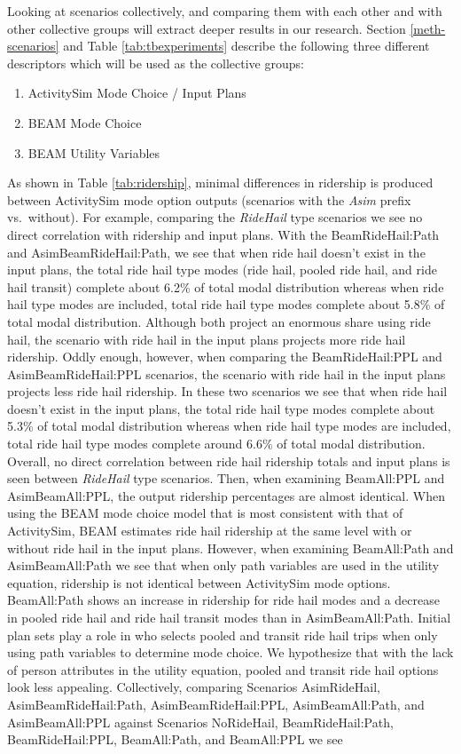 \documentclass[fancy, masters]{byuthesis}
\providecommand{\tightlist}{%
  \setlength{\itemsep}{0pt}\setlength{\parskip}{0pt}}
\begin{document}
Looking at scenarios collectively, and comparing them with each other and with other collective groups will extract deeper results in our research. Section \ref{meth-scenarios} and Table \ref{tab:tbexperiments} describe the following three different descriptors which will be used as the collective groups:

\begin{enumerate}
\def\labelenumi{\arabic{enumi}.}
\tightlist
\item
  ActivitySim Mode Choice / Input Plans
\item
  BEAM Mode Choice
\item
  BEAM Utility Variables
\end{enumerate}

As shown in Table \ref{tab:ridership}, minimal differences in ridership is produced between ActivitySim mode option outputs (scenarios with the \emph{Asim} prefix vs.~without). For example, comparing the \emph{RideHail} type scenarios we see no direct correlation with ridership and input plans. With the BeamRideHail:Path and AsimBeamRideHail:Path, we see that when ride hail doesn't exist in the input plans, the total ride hail type modes (ride hail, pooled ride hail, and ride hail transit) complete about 6.2\% of total modal distribution whereas when ride hail type modes are included, total ride hail type modes complete about 5.8\% of total modal distribution. Although both project an enormous share using ride hail, the scenario with ride hail in the input plans projects more ride hail ridership. Oddly enough, however, when comparing the BeamRideHail:PPL and AsimBeamRideHail:PPL scenarios, the scenario with ride hail in the input plans projects less ride hail ridership. In these two scenarios we see that when ride hail doesn't exist in the input plans, the total ride hail type modes complete about 5.3\% of total modal distribution whereas when ride hail type modes are included, total ride hail type modes complete around 6.6\% of total modal distribution. Overall, no direct correlation between ride hail ridership totals and input plans is seen between \emph{RideHail} type scenarios. Then, when examining BeamAll:PPL and AsimBeamAll:PPL, the output ridership percentages are almost identical. When using the BEAM mode choice model that is most consistent with that of ActivitySim, BEAM estimates ride hail ridership at the same level with or without ride hail in the input plans. However, when examining BeamAll:Path and AsimBeamAll:Path we see that when only path variables are used in the utility equation, ridership is not identical between ActivitySim mode options. BeamAll:Path shows an increase in ridership for ride hail modes and a decrease in pooled ride hail and ride hail transit modes than in AsimBeamAll:Path. Initial plan sets play a role in who selects pooled and transit ride hail trips when only using path variables to determine mode choice. We hypothesize that with the lack of person attributes in the utility equation, pooled and transit ride hail options look less appealing. Collectively, comparing Scenarios AsimRideHail, AsimBeamRideHail:Path, AsimBeamRideHail:PPL, AsimBeamAll:Path, and AsimBeamAll:PPL against Scenarios NoRideHail, BeamRideHail:Path, BeamRideHail:PPL, BeamAll:Path, and BeamAll:PPL we see 
\end{document}
